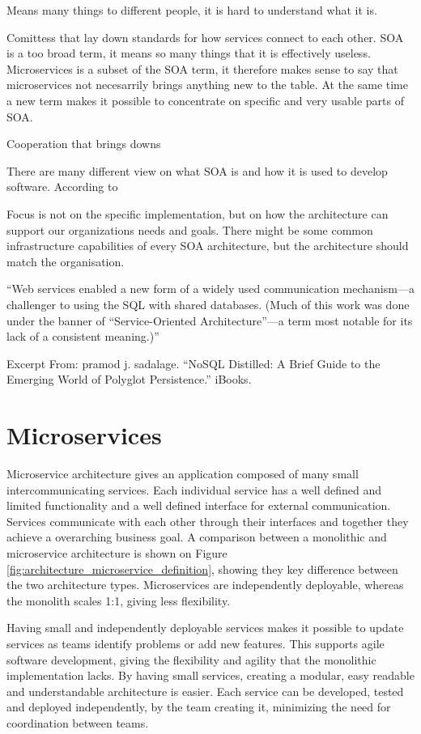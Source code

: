 Means many things to different people, it is hard to understand what it is.

Comittess that lay down standards for how services connect to each other. SOA is a too broad term, it means so many things that it is effectively useless. Microservices is a subset of the SOA term, it therefore makes sense to say that microservices not necesarrily brings anything new to the table. At the same time a new term makes it possible to concentrate on specific and very usable parts of SOA.

Cooperation that brings downs 

\cite{microsoft2017chapter}

There are many different view on what SOA is and how it is used to develop software. According to 

Focus is not on the specific implementation, but on how the architecture can support our organizations needs and goals. There might be some common infrastructure capabilities of every SOA architecture, but the architecture should match the organisation. 

“Web services enabled a new form of a widely used communication mechanism—a challenger to using the SQL with shared databases. (Much of this work was done under the banner of “Service-Oriented Architecture”—a term most notable for its lack of a consistent meaning.)”

Excerpt From: pramod j. sadalage. “NoSQL Distilled: A Brief Guide to the Emerging World of Polyglot Persistence.” iBooks. 


\section{Microservices}
Microservice architecture gives an application composed of many small intercommunicating services. Each individual service has a well defined and limited functionality and a well defined interface for external communication. Services communicate with each other through their interfaces and together they achieve a overarching business goal\cite[p.~2]{newman2015microservices}. A comparison between a monolithic and microservice architecture is shown on Figure \ref{fig:architecture_microservice_definition}, showing they key difference between the two architecture types. Microservices are independently deployable, whereas the monolith scales 1:1, giving less flexibility. 

Having small and independently deployable services makes it possible to update services as teams identify problems or add new features. This supports agile software development, giving the flexibility and agility that the monolithic implementation lacks. By having small services, creating a modular, easy readable and understandable architecture is easier. Each service can be developed, tested and deployed independently, by the team creating it, minimizing the need for coordination between teams\cite{kniberg2014spotify}.

